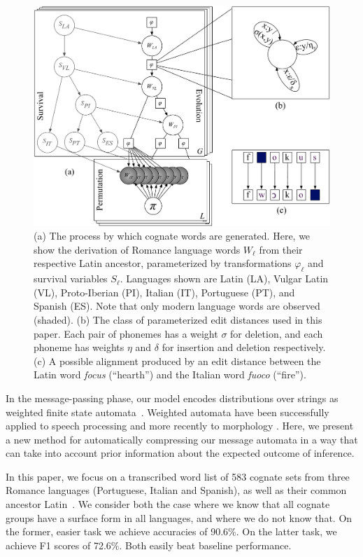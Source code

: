 \documentclass[11pt,a4paper]{article}
\begin{document}
\begin{figure}
  \centering
  \includegraphics[scale=0.435]{gmodel}
  \caption{(a) The process by which cognate words are generated.
  Here, we show the derivation of Romance language words $W_\ell$
  from their respective Latin ancestor, parameterized by transformations
  $\varphi_\ell$ and survival variables $S_\ell$. Languages shown are
  Latin (LA), Vulgar Latin (VL), Proto-Iberian (PI), Italian (IT),
  Portuguese (PT), and Spanish (ES). Note that only modern language
  words are observed (shaded).
  (b) The class of parameterized edit distances used in this paper.
  Each pair of phonemes has a weight $\sigma$ for deletion, and
  each phoneme has weights $\eta$ and $\delta$ for insertion and
  deletion respectively.
  (c) A possible alignment produced by an edit distance between the
  Latin word \textit{focus} (``hearth'') and the Italian word \textit{fuoco} (``fire'').
  } \label{fig:gmodel}
\end{figure}

In the message-passing phase, our model encodes distributions over
strings as weighted finite state automata~\cite{mohri09weighted}.
Weighted automata have been successfully applied to speech processing
\cite{Mohri96weightedautomata} and more recently to morphology
\cite{dreyer2009graphical}.  Here, we present a new method for
automatically compressing our message automata in a way that can
take into account prior information about the expected outcome of
inference.

In this paper, we focus on a transcribed word list of 583 cognate
sets from three Romance languages (Portuguese, Italian and Spanish),
as well as their common ancestor Latin~\cite{bouchard07probabilistic}.
We consider both the case where we know that all cognate groups
have a surface form in all languages, and where we do not know that.
On the former, easier task we achieve accuracies of 90.6\%. On the
latter task, we achieve F1 scores of 72.6\%. Both easily beat baseline
performance.
\end{document}

